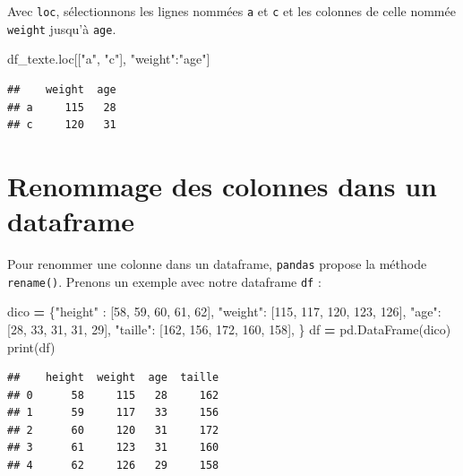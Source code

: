 \documentclass[
  12pt,
]{book}
\newenvironment{Shaded}{\begin{snugshade}}{\end{snugshade}}
\newcommand{\BuiltInTok}[1]{#1}
\newcommand{\DecValTok}[1]{\textcolor[rgb]{0.00,0.00,0.81}{#1}}
\newcommand{\NormalTok}[1]{#1}
\newcommand{\OperatorTok}[1]{\textcolor[rgb]{0.81,0.36,0.00}{\textbf{#1}}}
\newcommand{\StringTok}[1]{\textcolor[rgb]{0.31,0.60,0.02}{#1}}
\numberwithin{equation}{section}
\numberwithin{countremarque}{section}
\begin{document}
Avec \texttt{loc}, sélectionnons les lignes nommées \texttt{a} et \texttt{c} et les colonnes de celle nommée \texttt{weight} jusqu'à \texttt{age}.

\begin{Shaded}
\begin{Highlighting}[]
\NormalTok{df\_texte.loc[[}\StringTok{"a"}\NormalTok{, }\StringTok{"c"}\NormalTok{], }\StringTok{"weight"}\NormalTok{:}\StringTok{"age"}\NormalTok{]}
\end{Highlighting}
\end{Shaded}

\begin{lstlisting}
##    weight  age
## a     115   28
## c     120   31
\end{lstlisting}

\section{Renommage des colonnes dans un dataframe}\label{renommage-des-colonnes-dans-un-dataframe}

Pour renommer une colonne dans un dataframe, \texttt{pandas} propose la méthode \texttt{rename()}. Prenons un exemple avec notre dataframe \texttt{df} :

\begin{Shaded}
\begin{Highlighting}[]
\NormalTok{dico }\OperatorTok{=}\NormalTok{ \{}\StringTok{"height"}\NormalTok{ : [}\DecValTok{58}\NormalTok{, }\DecValTok{59}\NormalTok{, }\DecValTok{60}\NormalTok{, }\DecValTok{61}\NormalTok{, }\DecValTok{62}\NormalTok{],}
        \StringTok{"weight"}\NormalTok{: [}\DecValTok{115}\NormalTok{, }\DecValTok{117}\NormalTok{, }\DecValTok{120}\NormalTok{, }\DecValTok{123}\NormalTok{, }\DecValTok{126}\NormalTok{],}
        \StringTok{"age"}\NormalTok{: [}\DecValTok{28}\NormalTok{, }\DecValTok{33}\NormalTok{, }\DecValTok{31}\NormalTok{, }\DecValTok{31}\NormalTok{, }\DecValTok{29}\NormalTok{],}
        \StringTok{"taille"}\NormalTok{: [}\DecValTok{162}\NormalTok{, }\DecValTok{156}\NormalTok{, }\DecValTok{172}\NormalTok{, }\DecValTok{160}\NormalTok{, }\DecValTok{158}\NormalTok{],}
\NormalTok{       \} }
\NormalTok{df }\OperatorTok{=}\NormalTok{ pd.DataFrame(dico)}
\BuiltInTok{print}\NormalTok{(df)}
\end{Highlighting}
\end{Shaded}

\begin{lstlisting}
##    height  weight  age  taille
## 0      58     115   28     162
## 1      59     117   33     156
## 2      60     120   31     172
## 3      61     123   31     160
## 4      62     126   29     158
\end{lstlisting}
\end{document}
